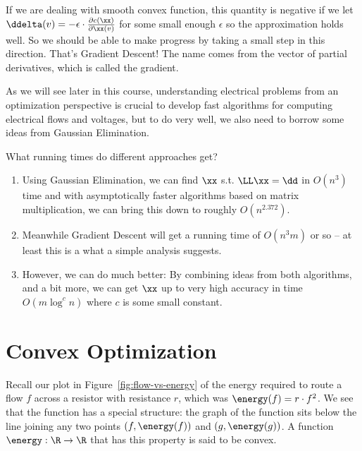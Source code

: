If we are dealing with smooth convex function,
this quantity is negative if we let $\ddelta(v) = -\epsilon \cdot \frac{\partial
  c(\xx)}{\partial\xx(v)}$ for some small enough $\epsilon$ so the
approximation holds well.
So we should be able to make progress by taking a small step in this
direction.
That's Gradient Descent!
The name comes from the vector of partial
derivatives, which is called the gradient.

As we will see later in this course, understanding electrical problems
from an optimization perspective is crucial to develop fast
algorithms for computing electrical flows and voltages, but to do very
well, we also need to borrow some ideas from Gaussian Elimination.

What running times do different approaches get?
\begin{enumerate}
\item Using Gaussian Elimination, we can find $\xx$ s.t. $\LL \xx =
  \dd$ in $O(n^3)$ time and with asymptotically faster algorithms based on matrix
  multiplication, we can bring this down to roughly $O(n^{2.372})$.
\item Meanwhile Gradient Descent will get a running time of $O(n^3m)$
  or so -- at least this is a what a simple analysis suggests.
\item However, we can do much better: By combining ideas from both
  algorithms, and a bit more,
  we can get $\xx$ up to very high
  accuracy in time $O(m \log^c n)$ where $c$ is some small constant.
\end{enumerate}


\section{Convex Optimization}

Recall our plot in Figure~\ref{fig:flow-vs-energy} of the energy required to
route a flow $f$ across a resistor with resistance $r$, which was
$\energy(f) = r\cdot f^2$.
%
We see that the function has a special structure: the graph of the function sits
below the line joining any two points $(f, \energy(f))$ and $(g,\energy(g))$.
A function $\energy : \R \to \R$ that has this property is said to be convex.

